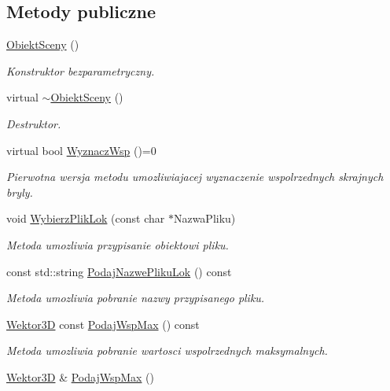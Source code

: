 \subsection*{Metody publiczne}
\begin{DoxyCompactItemize}
\item 
\hyperlink{classObiektSceny_a3ac6cda78772edd23c39b3827c1695d8}{Obiekt\+Sceny} ()
\begin{DoxyCompactList}\small\item\em Konstruktor bezparametryczny. \end{DoxyCompactList}\item 
virtual \hyperlink{classObiektSceny_ab34aec7f37d73f5b1cc4d3268ac39af9}{$\sim$\+Obiekt\+Sceny} ()
\begin{DoxyCompactList}\small\item\em Destruktor. \end{DoxyCompactList}\item 
virtual bool \hyperlink{classObiektSceny_a24dd0332c0755d7155128639a9a3e2b4}{Wyznacz\+Wsp} ()=0
\begin{DoxyCompactList}\small\item\em Pierwotna wersja metodu umozliwiajacej wyznaczenie wspolrzednych skrajnych bryly. \end{DoxyCompactList}\item 
void \hyperlink{classObiektSceny_a84c19442a6a0757a1702e72effbb66d9}{Wybierz\+Plik\+Lok} (const char $\ast$Nazwa\+Pliku)
\begin{DoxyCompactList}\small\item\em Metoda umozliwia przypisanie obiektowi pliku. \end{DoxyCompactList}\item 
const std\+::string \hyperlink{classObiektSceny_abe634a96ea225f2e21b3dead5207d122}{Podaj\+Nazwe\+Pliku\+Lok} () const
\begin{DoxyCompactList}\small\item\em Metoda umozliwia pobranie nazwy przypisanego pliku. \end{DoxyCompactList}\item 
\hyperlink{classSWektor}{Wektor3D} const \hyperlink{classObiektSceny_ae6e0207ad7d44742b2973e92382619bb}{Podaj\+Wsp\+Max} () const
\begin{DoxyCompactList}\small\item\em Metoda umozliwia pobranie wartosci wspolrzednych maksymalnych. \end{DoxyCompactList}\item 
\hyperlink{classSWektor}{Wektor3D} \& \hyperlink{classObiektSceny_a5a66f5506b5e30e47040d31c8b751c7a}{Podaj\+Wsp\+Max} ()

\end{DoxyCompactItemize}
